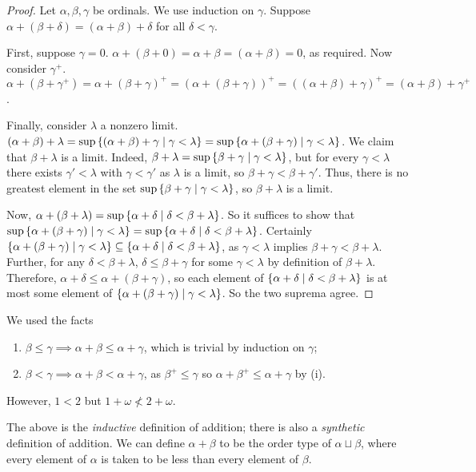 \begin{proof}
    Let \( \alpha, \beta, \gamma \) be ordinals.
    We use induction on \( \gamma \).
    Suppose \( \alpha + (\beta + \delta) = (\alpha + \beta) + \delta \) for all \( \delta < \gamma \).

    First, suppose \( \gamma = 0 \).
    \( \alpha + (\beta + 0) = \alpha + \beta = (\alpha + \beta) = 0 \), as required.
    Now consider \( \gamma^+ \).
    \( \alpha + (\beta + \gamma^+) = \alpha + (\beta + \gamma)^+ = (\alpha + (\beta + \gamma))^+ = ((\alpha + \beta) + \gamma)^+ = (\alpha + \beta) + \gamma^+ \).

    Finally, consider \( \lambda \) a nonzero limit.
    \( (\alpha + \beta) + \lambda = \sup \qty{(\alpha + \beta) + \gamma \mid \gamma < \lambda} = \sup \qty{\alpha + (\beta + \gamma) \mid \gamma < \lambda} \).
    We claim that \( \beta + \lambda \) is a limit.
    Indeed, \( \beta + \lambda = \sup\qty{\beta + \gamma \mid \gamma < \lambda} \), but for every \( \gamma < \lambda \) there exists \( \gamma' < \lambda \) with \( \gamma < \gamma' \) as \( \lambda \) is a limit, so \( \beta + \gamma < \beta + \gamma' \).
    Thus, there is no greatest element in the set \( \sup\qty{\beta + \gamma \mid \gamma < \lambda} \), so \( \beta + \lambda \) is a limit.

    Now, \( \alpha + (\beta + \lambda) = \sup\qty{\alpha + \delta \mid \delta < \beta + \lambda} \).
    So it suffices to show that \( \sup\qty{\alpha + (\beta + \gamma) \mid \gamma < \lambda} = \sup\qty{\alpha + \delta \mid \delta < \beta + \lambda} \).
    Certainly \( \qty{\alpha + (\beta + \gamma) \mid \gamma < \lambda} \subseteq \qty{\alpha + \delta \mid \delta < \beta + \lambda} \), as \( \gamma < \lambda \) implies \( \beta + \gamma < \beta + \lambda \).
    Further, for any \( \delta < \beta + \lambda \), \( \delta \leq \beta + \gamma \) for some \( \gamma < \lambda \) by definition of \( \beta + \lambda \).
    Therefore, \( \alpha + \delta \leq \alpha + (\beta + \gamma) \), so each element of \( \qty{\alpha + \delta \mid \delta < \beta + \lambda} \) is at most some element of \( \qty{\alpha + (\beta + \gamma) \mid \gamma < \lambda} \).
    So the two suprema agree.
\end{proof}
\begin{remark}
    We used the facts
    \begin{enumerate}
        \item \( \beta \leq \gamma \implies \alpha + \beta \leq \alpha + \gamma \), which is trivial by induction on \( \gamma \);
        \item \( \beta < \gamma \implies \alpha + \beta < \alpha + \gamma \), as \( \beta^+ \leq \gamma \) so \( \alpha + \beta^+ \leq \alpha + \gamma \) by (i).
    \end{enumerate}
    However, \( 1 < 2 \) but \( 1 + \omega \not < 2 + \omega \).
\end{remark}
The above is the \emph{inductive} definition of addition; there is also a \emph{synthetic} definition of addition.
We can define \( \alpha + \beta \) to be the order type of \( \alpha \sqcup \beta \), where every element of \( \alpha \) is taken to be less than every element of \( \beta \).

